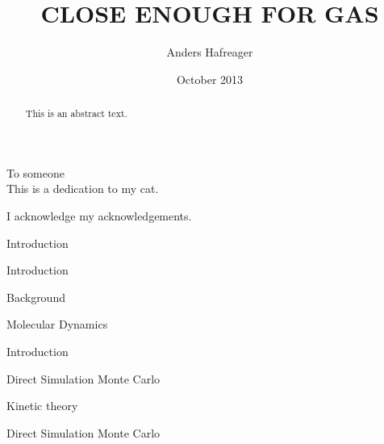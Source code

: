 \documentclass[twoside,english, a4paper, 12pt]{uiofysmaster}
\author{Anders Hafreager}
\title{\uppercase{Close enough for gas}}
\date{October 2013}
\begin{document}
\maketitle
\clearpage

\begin{abstract}
This is an abstract text.
\end{abstract}
\begin{dedication}
  To someone
  \\\vspace{12pt}
  This is a dedication to my cat.
\end{dedication}
\begin{acknowledgements}
  I acknowledge my acknowledgements.
\end{acknowledgements}

\tableofcontents
\clearpage
\listoffigures
\clearpage
\listoftables

\begin{part}{Introduction}
\begin{chapter}{Introduction}
  
\end{chapter}

\begin{chapter}{Background}
  
  
  
\end{chapter}
\end{part}

\begin{part}{Molecular Dynamics}
  \begin{chapter}{Introduction}
  
  \end{chapter}
  
  
\end{part}

\begin{part}{Direct Simulation Monte Carlo}

\begin{chapter}{Kinetic theory}
  
  
  
  
\end{chapter}

\begin{chapter}{Direct Simulation Monte Carlo}
  
  
  
  
  
\end{chapter}
\end{part}
\end{document}
